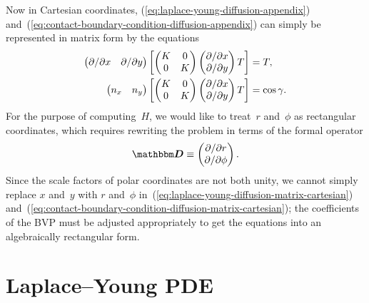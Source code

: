 Now in Cartesian coordinates,
(\ref{eq:laplace-young-diffusion-appendix})
and~(\ref{eq:contact-boundary-condition-diffusion-appendix})
can simply be represented in matrix form
by the equations
\begin{align}
  \begin{pmatrix}
    \pd / {\pd x} & \pd / {\pd y}
  \end{pmatrix}
  \squarebr*{
    \begin{pmatrix}
      K & 0 \\
      0 & K
    \end{pmatrix}
    \begin{pmatrix}
      \pd / {\pd x} \\
      \pd / {\pd y}
    \end{pmatrix}
    T
  }
    &= T,
    \label{eq:laplace-young-diffusion-matrix-cartesian} \\
  \begin{pmatrix}
    n_x & n_y
  \end{pmatrix}
  \squarebr*{
    \begin{pmatrix}
      K & 0 \\
      0 & K
    \end{pmatrix}
    \begin{pmatrix}
      \pd / {\pd x} \\
      \pd / {\pd y}
    \end{pmatrix}
    T
  }
    &= \cos\gamma.
    \label{eq:contact-boundary-condition-diffusion-matrix-cartesian}
\end{align}
For the purpose of computing~$H$,
we would like to treat~$r$ and~$\phi$ as rectangular coordinates,
which requires rewriting the problem in terms of the formal operator
\begin{equation}
  \matder \ideq
    \begin{pmatrix}
      \pd / {\pd r} \\
      \pd / {\pd\phi}
    \end{pmatrix}.
  \label{eq:small-formally-rectangular-derivative-appendix}
\end{equation}
Since the scale factors of polar coordinates are not both unity,
we cannot simply replace $x$ and~$y$ with $r$ and~$\phi$
in~(\ref{eq:laplace-young-diffusion-matrix-cartesian})
and~(\ref{eq:contact-boundary-condition-diffusion-matrix-cartesian});
the coefficients of the BVP must be adjusted appropriately
to get the equations into an algebraically rectangular form.

\section{Laplace--Young PDE}
\label{ch:extraction.pde}

